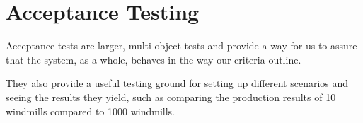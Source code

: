 \section{Acceptance Testing}\label{sec:acceptancetesting}
Acceptance tests are larger, multi-object tests and provide a way for us to assure that the system, as a whole, behaves in the way our criteria outline.

They also provide a useful testing ground for setting up different scenarios and seeing the results they yield, such as comparing the production results of \num{10} windmills compared to \num{1000} windmills.
